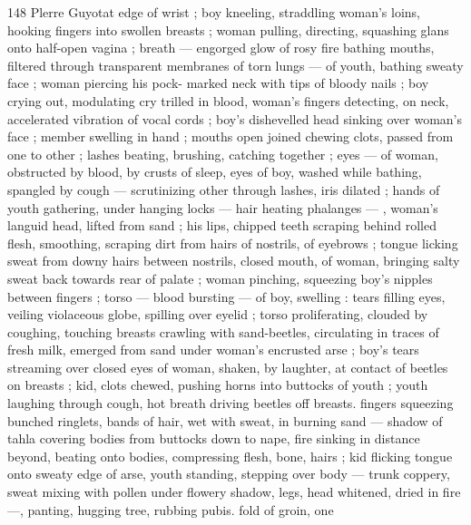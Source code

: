 148 Plerre Guyotat
edge of wrist ; boy kneeling, straddling woman's loins, hooking
fingers into swollen breasts ; woman pulling, directing, squashing
glans onto half-open vagina ; breath — engorged glow of rosy fire
bathing mouths, filtered through transparent membranes of torn
lungs — of youth, bathing sweaty face ; woman piercing his pock-
marked neck with tips of bloody nails ; boy crying out, modulating
cry trilled in blood, woman's fingers detecting, on neck, accelerated
vibration of vocal cords ; boy's dishevelled head sinking over
woman's face ; member swelling in hand ; mouths open joined
chewing clots, passed from one to other ; lashes beating, brushing,
catching together ; eyes — of woman, obstructed by blood, by
crusts of sleep, eyes of boy, washed while bathing, spangled by
cough — scrutinizing other through lashes, iris dilated ; hands of
youth gathering, under hanging locks — hair heating phalanges —
, woman's languid head, lifted from sand ; his lips, chipped teeth
scraping behind rolled flesh, smoothing, scraping dirt from hairs of
nostrils, of eyebrows ; tongue licking sweat from downy hairs
between nostrils, closed mouth, of woman, bringing salty sweat back
towards rear of palate ; woman pinching, squeezing boy's nipples
between fingers ; torso — blood bursting — of boy, swelling : tears
filling eyes, veiling violaceous globe, spilling over eyelid ; torso
proliferating, clouded by coughing, touching breasts crawling with
sand-beetles, circulating in traces of fresh milk, emerged from sand
under woman's encrusted arse ; boy's tears streaming over closed
eyes of woman, shaken, by laughter, at contact of beetles on breasts
; kid, clots chewed, pushing horns into buttocks of youth ; youth
laughing through cough, hot breath driving beetles off breasts.
fingers squeezing bunched ringlets, bands of hair, wet with sweat, in
burning sand — shadow of tahla covering bodies from buttocks
down to nape, fire sinking in distance beyond, beating onto bodies,
compressing flesh, bone, hairs ; kid flicking tongue onto sweaty edge
of arse, youth standing, stepping over body — trunk coppery, sweat
mixing with pollen under flowery shadow, legs, head whitened, dried
in fire —, panting, hugging tree, rubbing pubis. fold of groin, one

